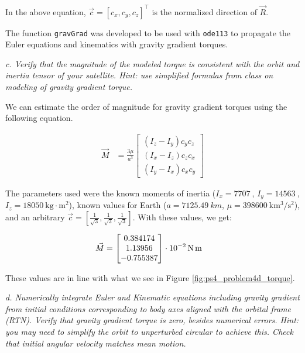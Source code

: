 In the above equation, $\Vec{c} = [c_x, c_y, c_z]^\intercal$ is the normalized direction of $\Vec{R}$.

The function \texttt{gravGrad} was developed to be used with \texttt{ode113} to propagate the Euler equations and kinematics with gravity gradient torques.



\textit{c. Verify that the magnitude of the modeled torque is consistent with the orbit and inertia tensor of your satellite. Hint: use simplified formulas from class on modeling of gravity gradient torque.}

We can estimate the order of magnitude for gravity gradient torques using the following equation.

\begin{align*}
    \Vec{M} &= \frac{3 \mu}{a^3}
    \begin{bmatrix}
    (I_z - I_y) c_y c_z \\
    (I_x - I_z) c_z c_x \\
    (I_y - I_x) c_x c_y
    \end{bmatrix}
\end{align*}

The parameters used were the known moments of inertia ($I_x = \qty{7707}{}$, $I_y = \qty{14563}{}$, $I_z = \qty{18050}{\kilogram\cdot\meter^2}$), known values for Earth ($a = \qty{7125.49}{km}$, $\mu = \qty{398600}{\km^3\per\second^2}$), and an arbitrary $\Vec{c} = [\frac{1}{\sqrt{3}}, \frac{1}{\sqrt{3}}, \frac{1}{\sqrt{3}}]$. With these values, we get:

\begin{align*}
    \Vec{M} &=
\qty[parse-numbers = false]{
    \begin{bmatrix}
    0.384174 \\
    1.13956 \\
    -0.755387
    \end{bmatrix}
    \cdot
    10^{-2}
}{\newton\meter}
\end{align*}

These values are in line with what we see in Figure \ref{fig:ps4_problem4d_torque}.

\newpage
\textit{d. Numerically integrate Euler and Kinematic equations including gravity gradient from initial conditions corresponding to body axes aligned with the orbital frame (RTN). Verify that gravity gradient torque is zero, besides numerical errors. Hint: you may need to simplify the orbit to unperturbed circular to achieve this. Check that initial angular velocity matches mean motion.}

